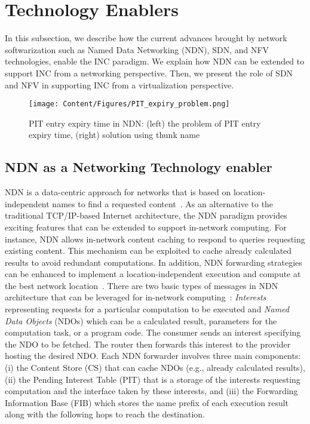 \section{Technology Enablers} \label{INC_Enablers} 
\noindent In this subsection, we describe how the current advances brought by network softwarization such as Named Data Networking (NDN), SDN, and NFV technologies, enable the INC paradigm. We explain how NDN can be extended to support INC from a networking perspective. Then, we present the role of SDN and NFV in supporting INC from a virtualization perspective.

 \begin{figure}
    \centering
    \texttt{[image: Content/Figures/PIT\_expiry\_problem.png]}
    \caption{PIT entry expiry time in NDN: (left) the problem of PIT entry expiry time, (right) solution using thunk name}
    \label{fig:PITexpiry}
\end{figure}

\label{NDN}\subsection{NDN as a Networking Technology enabler}
\noindent NDN is a data-centric approach for networks that is based on location-independent names to find a requested content~\cite{NDNsurvey}.
As an alternative to the traditional TCP/IP-based Internet architecture, the NDN paradigm provides exciting features that can be extended to support in-network computing. For instance, NDN allows in-network content caching to respond to queries requesting existing content. This mechanism can be exploited to cache already calculated results to avoid redundant computations. In addition, NDN forwarding strategies can be enhanced to implement a location-independent execution and compute at the best network location~\cite{NFCC}.
There are two basic types of messages in NDN architecture that can be leveraged for in-network computing~\cite{NDNwireless}: \textit{Interests} representing requests for a particular computation to be executed and \textit{Named Data Objects} (NDOs) which can be a calculated result, parameters for the computation task, or a program code. The consumer sends an interest specifying the NDO to be fetched. The router then forwards this interest to the provider hosting the desired NDO. Each NDN forwarder involves three main components: (i) the Content Store (CS) that can cache NDOs (e.g., already calculated results), (ii) the Pending Interest Table (PIT) that is a storage of the interests requesting computation and the interface taken by these interests, and (iii) the Forwarding Information Base (FIB) which stores the name prefix of each execution result along with the following hops to reach the destination.

